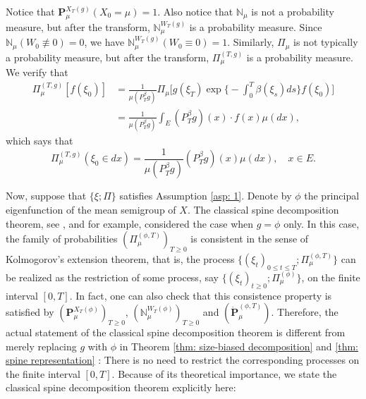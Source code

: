 \documentclass[12pt, a4paper]{amsart}
\theoremstyle{definition}
\numberwithin{equation}{section}
\begin{document}
    Notice that $\mathbf P^{X_T(g)}_\mu(X_0 = \mu) = 1$.
    Also notice that $\mathbb N_\mu$ is not a probability measure, but after the transform, $\mathbb N^{W_T(g)}_\mu$ is a probability measure.
	Since $\mathbb N_{\mu}(W_0 \not \equiv 0) = 0$, we have $\mathbb N_\mu^{W_T(g)}(W_0 \equiv 0) = 1$.
	Similarly, $\Pi_{\mu}$ is not typically a probability measure, 
	but after the transform, $\Pi_{\mu}^{(T,g)}$ is a probability measure.
    We verify that
\[\begin{split}
	\Pi_{\mu}^{(T,g)} [ f(\xi_0) ]
	&= \frac{1}{\mu(P^\beta_Tg)}\Pi_{\mu}\Big[g(\xi_T) \exp\Big\{-\int_0^T \beta(\xi_s)ds \Big\} f(\xi_0) \Big]
	\\&= \frac{1}{\mu(P^\beta_T g)} 
	\int_E (P^\beta_T g)(x) \cdot f(x)\mu(dx),
\end{split}\]
    which says that
\[\label{eq: initial distribution of spine}
	\Pi_{\mu}^{(T,g)} (\xi_0 \in dx)
	= \frac{1}{\mu(P^\beta_T g)} (P^\beta_T g)(x)\mu(dx),
	\quad x\in E.
\]

	Now, suppose that $\{\xi; \Pi\}$ satisfies Assumption \ref{asp: 1}.
	Denote by $\phi$ the principal eigenfunction of the mean semigroup of $X$.
	The classical spine decomposition theorem, see \cite{EckhoffKyprianouWinkel2015Spines}, \cite{EnglanderKyprianou2004Local} and \cite{LiuRenSong2009Llog} for example, considered the case when $g = \phi$ only.
	In this case, the family of probabilities $(\Pi_{\mu}^{(\phi,T)})_{T\geq 0}$ is consistent in the sense of Kolmogorov's extension theorem, that is,  the process $\{(\xi_t)_{0\leq t\leq T}; \Pi_{\mu}^{(\phi,T)} \}$ can be realized as the restriction of some process, say $\{(\xi_t)_{t\geq 0}; \Pi_{\mu}^{(\phi)}\}$, on the finite interval $[0,T]$.
	In fact, one can also check that this consistence property is satisfied by  $(\mathbf P_\mu^{X_T(\phi)} )_{T\geq 0}$, $(\mathbb N^{W_T(\phi)}_\mu)_{T\geq 0}$ and $(\dot {\mathbf P}^{(\phi,T)}_\mu)$.
	Therefore, the actual statement of the classical spine decomposition theorem is 
	different
	from merely replacing $g$ with $\phi$ in Theorem \ref{thm: size-biased decomposition} and \ref{thm: spine representation}
	: There is
	no need to restrict the corresponding processes on the finite interval $[0,T]$.
	Because of its theoretical importance, we state the classical spine decomposition theorem explicitly here:
	
\end{document}
